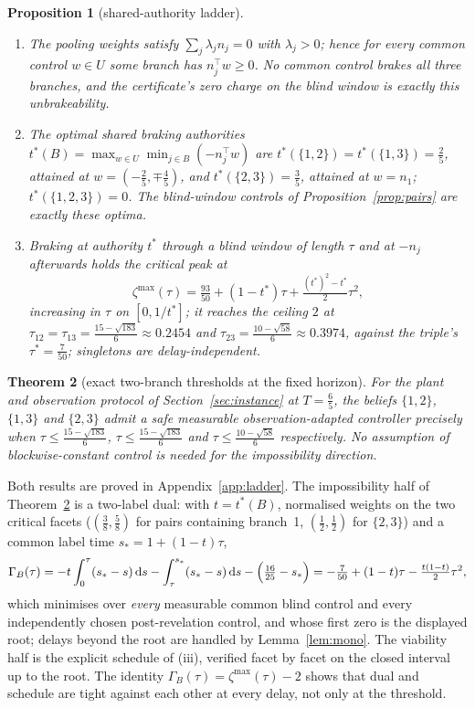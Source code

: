 \documentclass[11pt,a4paper]{article}
\theoremstyle{plain}
\newtheorem{theorem}{Theorem}[section]
\newtheorem{proposition}[theorem]{Proposition}
\theoremstyle{definition}
\theoremstyle{remark}
\newcommand{\tfr}[2]{\tfrac{#1}{#2}}
\newcommand{\dd}{\,\mathrm{d}}
\begin{document}
\begin{proposition}[shared-authority ladder]\label{prop:ladder}
\begin{enumerate}[label=\textup{(\roman*)},leftmargin=2.2em,itemsep=1pt]
\item The pooling weights satisfy $\sum_j\lambda_jn_j=0$ with $\lambda_j>0$; hence for every common control $w\in U$ some branch has $n_j^\top w\ge0$. No common control brakes all three branches, and the certificate's zero charge on the blind window is exactly this unbrakeability.
\item The optimal shared braking authorities $t^\ast(B)=\max_{w\in U}\min_{j\in B}(-n_j^\top w)$ are $t^\ast(\{1,2\})=t^\ast(\{1,3\})=\tfr25$, attained at $w=(-\tfr25,\mp\tfr45)$, and $t^\ast(\{2,3\})=\tfr35$, attained at $w=n_1$; $t^\ast(\{1,2,3\})=0$. The blind-window controls of Proposition~\ref{prop:pairs} are exactly these optima.
\item Braking at authority $t^\ast$ through a blind window of length $\tau$ and at $-n_j$ afterwards holds the critical peak at
\[
\zeta^{\max}(\tau)=\tfr{93}{50}+(1-t^\ast)\tau+\tfr{(t^\ast)^2-t^\ast}{2}\tau^2 ,
\]
increasing in $\tau$ on $[0,1/t^\ast]$; it reaches the ceiling $2$ at $\tau_{12}=\tau_{13}=\tfr{15-\sqrt{183}}{6}\approx0.2454$ and $\tau_{23}=\tfr{10-\sqrt{58}}{6}\approx0.3974$, against the triple's $\tau^\ast=\tfr7{50}$; singletons are delay-independent.
\end{enumerate}
\end{proposition}

\begin{theorem}[exact two-branch thresholds at the fixed horizon]\label{thm:pairs}
For the plant and observation protocol of Section~\ref{sec:instance} at $T=\tfr65$, the beliefs $\{1,2\}$, $\{1,3\}$ and $\{2,3\}$ admit a safe measurable observation-adapted controller precisely when $\tau\le\tfr{15-\sqrt{183}}6$, $\tau\le\tfr{15-\sqrt{183}}6$ and $\tau\le\tfr{10-\sqrt{58}}6$ respectively. No assumption of blockwise-constant control is needed for the impossibility direction.
\end{theorem}

Both results are proved in Appendix~\ref{app:ladder}. The impossibility half of Theorem~\ref{thm:pairs} is a two-label dual: with $t=t^\ast(B)$, normalised weights on the two critical facets ($(\tfr38,\tfr58)$ for pairs containing branch~1, $(\tfr12,\tfr12)$ for $\{2,3\}$) and a common label time $s_\ast=1+(1-t)\tau$,
\begin{equation}\label{eq:pairdual}
\Gamma_B(\tau)=-t\int_0^\tau(s_\ast-s)\dd s-\int_\tau^{s_\ast}(s_\ast-s)\dd s-\Bigl(\tfr{16}{25}-s_\ast\Bigr)=-\tfr7{50}+(1-t)\tau-\tfr{t(1-t)}2\tau^2 ,
\end{equation}
which minimises over \emph{every} measurable common blind control and every independently chosen post-revelation control, and whose first zero is the displayed root; delays beyond the root are handled by Lemma~\ref{lem:mono}. The viability half is the explicit schedule of (iii), verified facet by facet on the closed interval up to the root. The identity $\Gamma_B(\tau)=\zeta^{\max}(\tau)-2$ shows that dual and schedule are tight against each other at every delay, not only at the threshold.
\end{document}
